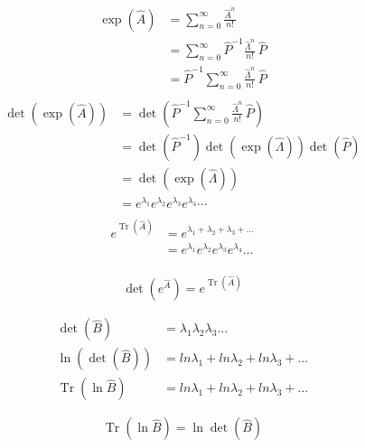 \documentclass{article}
\begin{document}
\begin{align*}
    \exp\left(\hat{A}\right) & = \sum_{n=0}^\infty \frac{\hat{A}^n} {n!} \\ 
    &= \sum_{n=0}^\infty  \hat{P}^{-1} \frac{\hat{\Lambda}^n} {n!}\, \hat{P}\\
    &= \hat{P}^{-1} \sum_{n=0}^\infty  \frac{\hat{\Lambda}^n} {n!}\, \hat{P}\\
\end{align*}
\begin{align*}
    \operatorname{det}\left(\exp\left(\hat{A}\right) \right)&= \operatorname{det}\left(\hat{P}^{-1} \sum_{n=0}^\infty  \frac{\hat{\Lambda}^n} {n!}\, \hat{P} \right)\\
    &= \operatorname{det}\left(\hat{P}^{-1}\right)\operatorname{det}\left(\exp\left(\hat \Lambda\right)\right)\operatorname{det}\left(\hat{P}\right)\\
    &= \operatorname{det}\left(\exp\left(\hat \Lambda\right)\right)\\
    &= e^{\lambda_1}e^{\lambda_2}e^{\lambda_3}e^{\lambda_4}\cdots\\
\end{align*}
\begin{align*}
    e^{\operatorname{Tr} \left(\hat{A}\right)}&=e^{\lambda_1+\lambda_2+\lambda_3+\ldots} \\
    &= e^{\lambda_1}e^{\lambda_2}e^{\lambda_3}e^{\lambda_4}\ldots\\
\end{align*}

\begin{equation*}\boxed{
    \operatorname{det}\left(e^{\hat{A}}\right)=e^{\operatorname{Tr}(\hat{A})}}
\end{equation*}

\begin{align*}
    \operatorname{det}\left(\hat{B} \right) &= \lambda_1 \lambda_2 \lambda_3 \ldots\\
    \ln\left(\operatorname{det}\left(\hat{B} \right)\right) & = ln \lambda_1+ ln \lambda_2+ ln \lambda_3+\ldots\\
    \operatorname{Tr}\left( \ln{\hat{B}} \right) &=  ln \lambda_1+ ln \lambda_2+ ln \lambda_3+\ldots
\end{align*}

\begin{equation*}
\boxed{ \operatorname{Tr}\left( \ln{\hat{B}} \right) = \ln{\operatorname{det}\left(\hat{B}\right)}}
\end{equation*}
\end{document}
